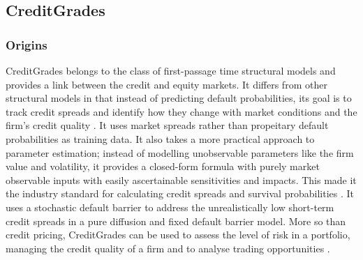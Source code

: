 \documentclass[11t,a4paper]{article}
\begin{document}
\subsection{CreditGrades}
\subsubsection{Origins}
CreditGrades belongs to the class of first-passage time structural models and provides a link between the credit and equity markets. It differs from other structural models in that instead of predicting default probabilities, its goal is to track credit spreads and identify how they change with market conditions and the firm's credit quality \cite{sfin}. It uses market spreads rather than propeitary default probabilities as training data. It also takes a more practical approach to parameter estimation; instead of modelling unobservable parameters like the firm value and volatility, it provides a closed-form formula with purely market observable inputs with easily ascertainable sensitivities and impacts. This made it the industry standard for calculating credit spreads and survival probabilities \cite{cgtechdoc}. It uses a stochastic default barrier to address the unrealistically low short-term credit spreads in a pure diffusion and fixed default barrier model. More so than credit pricing, CreditGrades can be used to assess the level of risk in a portfolio, managing the credit quality of a firm and to analyse trading opportunities \cite{cgtechdoc}. 
\end{document}
